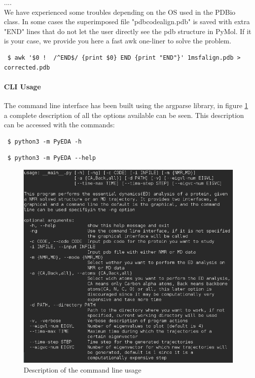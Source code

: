 \documentclass[12pt]{article}
\begin{document}
 ....\\
 
 We have experienced some troubles depending on the OS used in the PDBio class. In some cases the superimposed file "pdbcodealign.pdb" is saved with extra "END" lines that do not let the user directly see the pdb structure in PyMol. If it is your case, we provide you here a fast awk one-liner to solve the problem.  
 \begin{lstlisting}
 $ awk '$0 !  /^END$/ {print $0} END {print "END"}' 1msfalign.pdb > corrected.pdb
 \end{lstlisting}
 \paragraph{CLI Usage}
 The command line interface has been built using the argparse library, in figure \ref{fig:usage} a complete description of all the options available can be seen. This description can be accessed with the commands:
 \begin{lstlisting}
 $ python3 -m PyEDA -h 
 \end{lstlisting}
 \begin{lstlisting}
 $ python3 -m PyEDA --help
 \end{lstlisting}
 \begin{figure}[h]
 \centering
 \includegraphics[scale=0.4]{usage.png}
 \caption{Description of the command line usage}
 \label{fig:usage}
 \end{figure}
 
\end{document}
